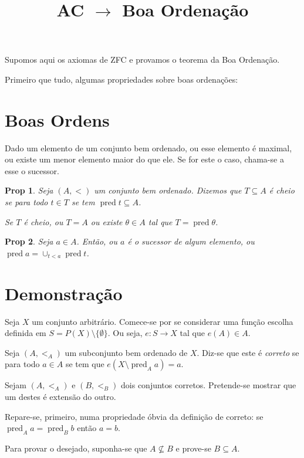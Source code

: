 \documentclass{article}
\title{AC $\rightarrow$ Boa Ordenação}
\author{}
\date{}
\newtheorem{prop}{Prop}
\DeclareMathOperator{\pred}{pred}
\begin{document}
	\maketitle

	Supomos aqui os axiomas de ZFC e provamos o teorema da Boa Ordenação.
	
	Primeiro que tudo, algumas propriedades sobre boas ordenações:
	
	\section{Boas Ordens}
	
	Dado um elemento de um conjunto bem ordenado, ou esse elemento é maximal, ou existe um menor elemento maior do que ele. Se for este o caso, chama-se a esse o sucessor.
	
	\begin{prop}
	Seja $(A, <)$ um conjunto bem ordenado. Dizemos que $T \subseteq A$ é \emph{cheio} se para todo $t \in T$ se tem $\pred t \subseteq A$.
	
	Se $T$ é cheio, ou $T = A$ ou existe $\theta \in A$ tal que $T = \pred \theta$.
	\end{prop}
	
	\begin{prop}
	Seja $a \in A$. Então, ou $a$ é o sucessor de algum elemento, ou $\pred a = \cup_{t < a} \pred t$.
	\end{prop}
	
	\section{Demonstração}
	
	Seja $X$ um conjunto arbitrário. Comece-se por se considerar uma função escolha definida em $S = P(X) \setminus \{\emptyset\}$. Ou seja, $e : S \rightarrow X$ tal que $e(A) \in A$.
	
	Seja $(A, <_A)$ um subconjunto bem ordenado de $X$. Diz-se que este é \emph{correto} se para todo $a \in A$ se tem que $e(X \setminus \pred_A a) = a$.
	
	Sejam $(A, <_A)$ e $(B, <_B)$ dois conjuntos corretos. Pretende-se mostrar que um destes é extensão do outro.
	
	Repare-se, primeiro, numa propriedade óbvia da definição de correto: se $\pred_A a = \pred_B b$ então $a = b$.

	Para provar o desejado, suponha-se que $A \not \subseteq B$ e prove-se $B \subseteq A$.
	
\end{document}
